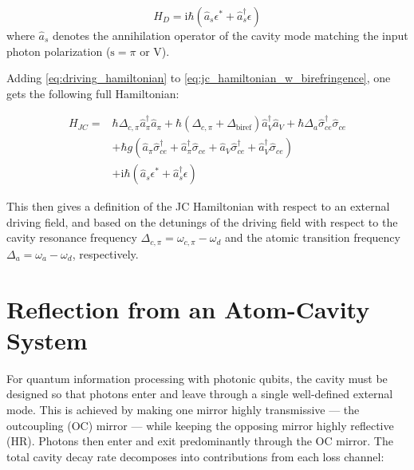 \begin{equation}
	H_D = \mathrm{i}\hbar\left(\hat{a}_{s}\epsilon^{*} + \hat{a}_{s}^{\dagger} \epsilon\right)
	\label{eq:driving_hamiltonian}
\end{equation}
where $\hat{a}_s$ denotes the annihilation operator of the cavity mode matching the input photon polarization ($\text{s}=\pi\text{ or V}$).

Adding \eqref{eq:driving_hamiltonian} to \eqref{eq:jc_hamiltonian_w_birefringence}, one gets the following full Hamiltonian:

\begin{equation}
	\begin{split}
		H_{JC} = & \hbar\Delta_{c,\pi}\hat{a}_\pi^{\dagger}\hat{a}_\pi + \hbar\left(\Delta_{c,\pi}+\Delta_{\text{biref}}\right)\hat{a}_V^{\dagger}\hat{a}_V + \hbar\Delta_{a} \hat{\sigma}_{ce}^{\dagger}\hat{\sigma}_{ce} \\
		         & + \hbar g \left( \hat{a}_\pi\hat{\sigma}_{ce}^{\dagger} + \hat{a}_\pi^{\dagger}\hat{\sigma}_{ce} + \hat{a}_V\hat{\sigma}_{ce}^{\dagger} + \hat{a}_V^{\dagger}\hat{\sigma}_{ce} \right)                  \\
		         & + \mathrm{i}\hbar\left(\hat{a}_{s}\epsilon^{*} + \hat{a}_{s}^{\dagger} \epsilon\right)
	\end{split}
	\label{eq:jc_hamiltonian_w_birefringence_w_drive}
\end{equation}

This then gives a definition of the JC Hamiltonian with respect to an external driving field, and based on the detunings of the driving field with respect to the cavity resonance frequency $\Delta_{c,\pi}=\omega_{c,\pi}-\omega_d$ and the atomic transition frequency $\Delta_{a}=\omega_a-\omega_d$, respectively.

\section{Reflection from an Atom-Cavity System}

For quantum information processing with photonic qubits, the cavity must be designed so that photons enter and leave through a single well-defined external mode. This is achieved by making one mirror highly transmissive --- the outcoupling (OC) mirror --- while keeping the opposing mirror highly reflective (HR). Photons then enter and exit predominantly through the OC mirror. The total cavity decay rate decomposes into contributions from each loss channel:

